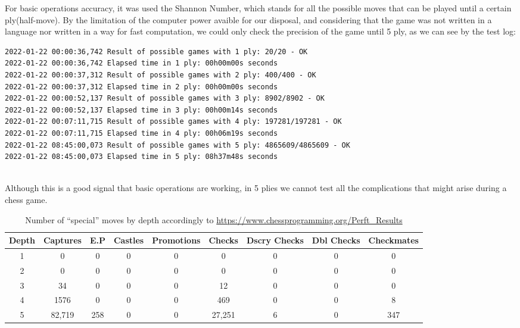 \documentclass[10pt]{article}
\begin{document}
For basic operations accuracy, it was used the Shannon Number,
which stands for all the possible moves that can be played until a certain
ply(half-move). By the limitation of the computer power avaible for our
disposal, and considering that the game was not written in a language nor
written in a way for fast computation, we could only check the precision of the
game until 5 ply, as we can see by the test log:
\begin{lstlisting}
2022-01-22 00:00:36,742 Result of possible games with 1 ply: 20/20 - OK
2022-01-22 00:00:36,742 Elapsed time in 1 ply: 00h00m00s seconds
2022-01-22 00:00:37,312 Result of possible games with 2 ply: 400/400 - OK
2022-01-22 00:00:37,312 Elapsed time in 2 ply: 00h00m00s seconds
2022-01-22 00:00:52,137 Result of possible games with 3 ply: 8902/8902 - OK
2022-01-22 00:00:52,137 Elapsed time in 3 ply: 00h00m14s seconds
2022-01-22 00:07:11,715 Result of possible games with 4 ply: 197281/197281 - OK
2022-01-22 00:07:11,715 Elapsed time in 4 ply: 00h06m19s seconds
2022-01-22 08:45:00,073 Result of possible games with 5 ply: 4865609/4865609 - OK
2022-01-22 08:45:00,073 Elapsed time in 5 ply: 08h37m48s seconds
    
\end{lstlisting}

Although this is a good signal that basic operations are working, in 5 plies we
cannot test all the complications that might arise during a chess game.

\begin{table}[H]
\center
\begin{tabular}{|c|c|c|c|c|c|c|c|c|}
\hline
\textbf{Depth}   & \textbf{Captures} & \textbf{E.P} &
\textbf{Castles} & \textbf{Promotions} & \textbf{Checks} & \textbf{Dscry
Checks} & \textbf{Dbl Checks} & \textbf{Checkmates} \\
\hline
   1  & 0 & 0 & 0 & 0 & 0 & 0 & 0 & 0 \\
\hline
   2  & 0 & 0 & 0 & 0 & 0 & 0 & 0 & 0 \\
\hline
   3  & 34 & 0 & 0 & 0 & 12 & 0 & 0 & 0 \\
\hline
   4  & 1576 & 0 & 0 & 0 & 469 & 0 & 0 & 8 \\
\hline
5  & 82,719 & 258 & 0 & 0 & 27,251 & 6 & 0 & 347 \\
\hline
\end{tabular}
\caption{Number of ``special'' moves by depth accordingly to
\url{https://www.chessprogramming.org/Perft_Results} }
\end{table}
\end{document}
